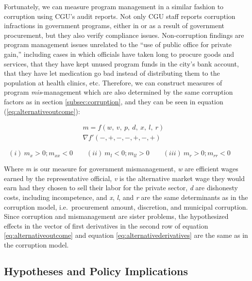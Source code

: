 \documentclass[11pt]{article}
\begin{document}
Fortunately, we can measure program management in a similar fashion to corruption using CGU's audit reports. Not only CGU staff reports corruption infractions in government programs, either in or as a result of government procurement, but they also verify compliance issues. Non-corruption findings are program management issues unrelated to the ``use of public office for private gain,'' including cases in which officials have taken long to procure goods and services, that they have kept unused program funds in the city's bank account, that they have let medication go bad instead of distributing them to the population at health clinics, etc. Therefore, we can construct measures of program \emph{mis}-management which are also determined by the same corruption factors as in section \ref{subsec:corruption}, and they can be seen in equation (\ref{eq:alternativeoutcome}):

\begin{equation} \label{eq:alternativeoutcome}
  \begin{aligned}
    m = f(w,\ v,\ p,\ d,\ x,\ l,\ r)& \\
    \nabla f'(-,+,-,-,+,-,+)&
  \end{aligned}
\end{equation}

\begin{equation} \label{eq:alternativederivatives}
  (i) \   m_{x} > 0; m_{xx} < 0 \qquad
  (ii) \  m_{l} < 0; m_{ll} > 0 \qquad
  (iii) \ m_{r} > 0; m_{rr} < 0 \qquad
\end{equation}

Where \emph{m} is our measure for government mismanagement, \emph{w} are efficient wages earned by the representative official, \emph{v} is the alternative market wage they would earn had they chosen to sell their labor for the private sector, \emph{d} are dishonesty costs, including incompetence, and \emph{x}, \emph{l}, and \emph{r} are the same determinants as in the corruption model, i.e.~procurement amount, discretion, and municipal corruption. Since corruption and mismanagement are sister problems, the hypothesized effects in the vector of first derivatives in the second row of equation \ref{eq:alternativeoutcome} and equation \ref{eq:alternativederivatives} are the same as in the corruption model.

\subsection{Hypotheses and Policy Implications} \label{subsec:hypotheses}
\end{document}
